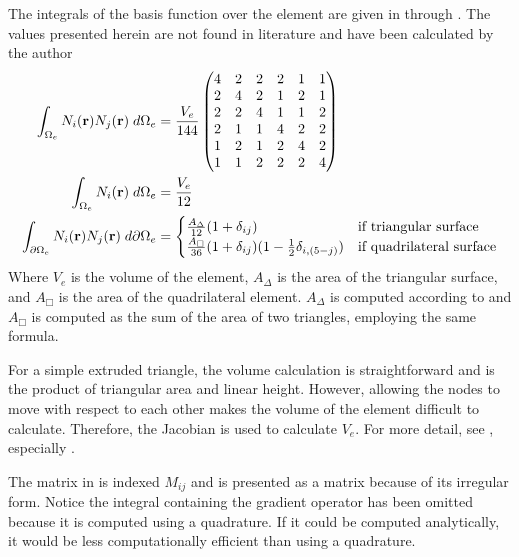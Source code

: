       The integrals of the basis function over the element are given in
       through . The values
      presented herein are not found in literature and have been calculated by
      the author
      \begin{align}
        \label{eq:bigmat}
        \int_{\Omega_e} N_i(\mathbf{r}) N_j(\mathbf{r}) \;d\Omega_e &= 
          \frac{V_e}{144}
          \begin{pmatrix}
            4 & 2 & 2 & 2 & 1 & 1 \\
            2 & 4 & 2 & 1 & 2 & 1 \\
            2 & 2 & 4 & 1 & 1 & 2 \\
            2 & 1 & 1 & 4 & 2 & 2 \\
            1 & 2 & 1 & 2 & 4 & 2 \\
            1 & 1 & 2 & 2 & 2 & 4 
          \end{pmatrix} \\
        \int_{\Omega_e} N_i(\mathbf{r}) \;d\Omega_e &= \frac{V_e}{12} \\
        \label{eq:wedge_surface_integral}
        \int_{\partial \Omega_e} N_i(\mathbf{r}) 
          N_j(\mathbf{r}) \;d\partial\Omega_e &= 
          \begin{cases}
            \frac{A_{\Delta}}{12}(1+\delta_{ij})&\text{if triangular surface} \\
            \frac{A_{\Box}}{36}(1+\delta_{ij})(1-\frac{1}{2} \delta_{i,(5-j)}) &
              \text{if quadrilateral surface}
          \end{cases}
      \end{align}
      Where $V_e$ is the volume of the element, $A_{\Delta}$ is the area of the
      triangular surface, and $A_{\Box}$ is the area of the quadrilateral
      element. $A_{\Delta}$ is computed according to  and
      $A_{\Box}$ is computed as the sum of the area of two triangles, employing
      the same formula.
      
      For a simple extruded triangle,
      the volume calculation is straightforward and is the product of triangular
      area and linear height. However, allowing the nodes to
      move with respect to each other makes the volume of the element difficult
      to calculate. Therefore, the Jacobian is used to calculate $V_e$. For more
      detail, see , especially .

      The matrix in  is indexed $M_{ij}$
      and is presented as a matrix because of its irregular form. Notice the 
      integral containing the gradient operator has been omitted because it is
      computed using a quadrature. If it could be computed analytically, it 
      would be less computationally efficient than using a quadrature.

